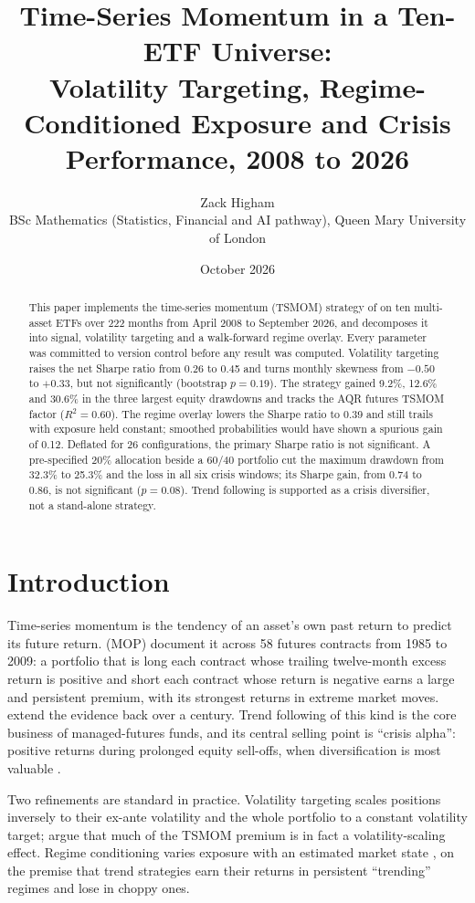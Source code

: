 \documentclass[11pt,a4paper]{article}
\title{\textbf{Time-Series Momentum in a Ten-ETF Universe:\\
Volatility Targeting, Regime-Conditioned Exposure and Crisis Performance, 2008 to 2026}}
\author{Zack Higham\\[2pt]
\small BSc Mathematics (Statistics, Financial and AI pathway), Queen Mary University of London}
\date{October 2026}
\begin{document}
\maketitle

\begin{abstract}
\noindent
This paper implements the time-series momentum (TSMOM) strategy of \citet{moskowitz2012} on ten multi-asset ETFs over 222 months from April 2008 to September 2026, and decomposes it into signal, volatility targeting and a walk-forward regime overlay. Every parameter was committed to version control before any result was computed. Volatility targeting raises the net Sharpe ratio from 0.26 to 0.45 and turns monthly skewness from $-0.50$ to $+0.33$, but not significantly (bootstrap $p = 0.19$). The strategy gained 9.2\%, 12.6\% and 30.6\% in the three largest equity drawdowns and tracks the AQR futures TSMOM factor ($R^2 = 0.60$). The regime overlay lowers the Sharpe ratio to 0.39 and still trails with exposure held constant; smoothed probabilities would have shown a spurious gain of 0.12. Deflated for 26 configurations, the primary Sharpe ratio is not significant. A pre-specified 20\% allocation beside a 60/40 portfolio cut the maximum drawdown from 32.3\% to 25.3\% and the loss in all six crisis windows; its Sharpe gain, from 0.74 to 0.86, is not significant ($p = 0.08$). Trend following is supported as a crisis diversifier, not a stand-alone strategy.
\end{abstract}

\section{Introduction}

Time-series momentum is the tendency of an asset's own past return to predict its future return. \citet{moskowitz2012} (MOP) document it across 58 futures contracts from 1985 to 2009: a portfolio that is long each contract whose trailing twelve-month excess return is positive and short each contract whose return is negative earns a large and persistent premium, with its strongest returns in extreme market moves. \citet{hurst2017} extend the evidence back over a century. Trend following of this kind is the core business of managed-futures funds, and its central selling point is ``crisis alpha'': positive returns during prolonged equity sell-offs, when diversification is most valuable \citep{fung2001}.

Two refinements are standard in practice. Volatility targeting scales positions inversely to their ex-ante volatility and the whole portfolio to a constant volatility target; \citet{kim2016} argue that much of the TSMOM premium is in fact a volatility-scaling effect. Regime conditioning varies exposure with an estimated market state \citep{hamilton1989,ang2002}, on the premise that trend strategies earn their returns in persistent ``trending'' regimes and lose in choppy ones.
\end{document}
